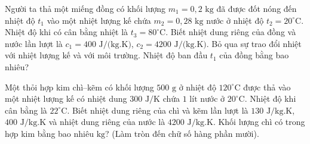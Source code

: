 \begin{ex}
Người ta thả một miếng đồng có khối lượng $m_1=0{,}2\text{ kg}$ đã được đốt nóng đến nhiệt độ $t_1$ vào một nhiệt lượng kế chứa $m_2=0{,}28\text{ kg}$ nước ở nhiệt độ $t_2=20^\circ\text{C}$. Nhiệt độ khi có cân bằng nhiệt là $t_3=80^\circ\text{C}$. Biết nhiệt dung riêng của đồng và nước lần lượt là $c_1=400\text{ J/(kg.K)}$, $c_2=4200\text{ J/(kg.K)}$. Bỏ qua sự trao đổi nhiệt với nhiệt lượng kế và với môi trường. Nhiệt độ ban đầu $t_1$ của đồng bằng bao nhiêu?


\end{ex}

\begin{ex}
Một thỏi hợp kim chì--kẽm có khối lượng $500\text{ g}$ ở nhiệt độ $120^\circ\text{C}$ được thả vào một nhiệt lượng kế có nhiệt dung $300\text{ J/K}$ chứa $1\text{ lít}$ nước ở $20^\circ\text{C}$. Nhiệt độ khi cân bằng là $22^\circ\text{C}$. Biết nhiệt dung riêng của chì và kẽm lần lượt là $130\text{ J/kg.K}$, $400\text{ J/kg.K}$ và nhiệt dung riêng của nước là $4200\text{ J/kg.K}$. Khối lượng chì có trong hợp kim bằng bao nhiêu $\text{kg}$? (Làm tròn đến chữ số hàng phần mười).


\end{ex}

